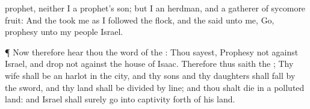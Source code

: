 {prophet, neither
{} I a
prophet’s
son; but I
{} an
herdman, and a
gatherer of sycomore
fruit:
And the
{}
took me as I
followed the
flock, and the
{}
said unto me,
Go,
prophesy unto my
people
Israel.
\par }{\PP {}¶ Now therefore
hear thou the
word of the
{}: Thou
sayest,
Prophesy not against
Israel, and
drop not
{} against the
house of
Isaac.
Therefore thus
saith the
{}; Thy
wife shall be an
harlot in the
city, and thy
sons and thy
daughters shall
fall by the
sword, and thy
land shall be
divided by
line; and thou shalt
die
in a
polluted
land: and
Israel shall
surely go into
captivity forth of his
land.

}
